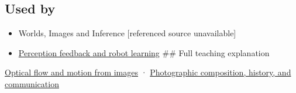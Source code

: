 \subsection{Used by}\label{appendix-e2e73f8cd93e-used-by}

\begin{itemize}
\item
  {Worlds, Images and Inference {[}referenced source unavailable{]}}
\item
  \hyperref[appendix-b0c42da325f1]{Perception feedback and robot learning} \#\# Full teaching explanation
\end{itemize}

\hyperref[04-visual-computing-ii-ch030-optical-flow-and-motion-from-images]{Optical flow and motion from images} · \hyperref[04-visual-computing-ii-ch034-photographic-composition-history-and-communication]{Photographic composition, history, and communication}
